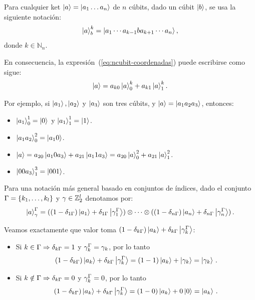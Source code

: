 \begin{notation}
  Para cualquier ket $\ket{a}=\ket{a_1\dots a_n}$ de $n$ cúbits, dado un cúbit $\ket{b}$, se usa la siguiente notación:
  \begin{equation}
    \label{eq:ncubit-only-one-state}
    \ket{a}^{k}_{b} = \ket{a_1\cdots a_{k-1}b a_{k+1}\cdots a_n},
  \end{equation}
  donde $k \in \mathbb{N}_n$.
\end{notation}

En consecuencia, la expresión~(\ref{eq:ncubit-coordenadas}) puede escribirse como sigue:
\begin{equation}
  \label{eq:canonical-state}
  \ket{a}= a_{k0}\ket{a}^{k}_{0}+a_{k1}\ket{a}^{k}_{1}.
\end{equation}

Por ejemplo, si $\ket{a_1},\ket{a_2}$ y $\ket{a_3}$ son tres cúbits, y $\ket{a} = \ket{a_1 a_2 a_3}$, entonces:
\begin{itemize}
  \item $\ket{a_1}^{1}_{0}=\ket{0}$ y $\ket{a_1}^{1}_{1}=\ket{1}$.
  \item $\ket{a_1 a_2}^{2}_{0}=\ket{a_1 0}$.
  \item $\ket{a}=a_{20}\ket{a_1 0 a_3}+a_{21}\ket{a_1 1 a_3}=a_{20}\ket{a}^{2}_{0}+a_{21}\ket{a}^{2}_{1}$.
  \item $\ket{00a_3}^{3}_{1}=\ket{001}$.
\end{itemize}

\begin{notation}
  Para una notación más general basado en conjuntos de índices, dado el conjunto $\Gamma=\{k_1,\dots,k_l\}$ y $\gamma\in\mathbb{Z}_2^l$ denotamos por:
  \[
    \ket{a}^{\Gamma}_{\gamma}=((1-\delta_{1\Gamma})\ket{a_1}+\delta_{1\Gamma}\ket{{\gamma}^{\Gamma}_1})\otimes\dots\otimes ((1-\delta_{n\Gamma})\ket{a_n}+\delta_{n\Gamma}\ket{{\gamma}^{\Gamma}_n})\,.
  \]
\end{notation}

Veamos exactamente que valor toma $(1-\delta_{k\Gamma})\ket{a_k}+\delta_{k\Gamma}\ket{{\gamma}^{\Gamma}_k}$:
\begin{itemize}
  \item Si $k\in\Gamma\Rightarrow\delta_{k\Gamma}=1$ y ${\gamma}^{\Gamma}_k=\gamma_k$, por lo tanto
        \begin{equation*}
          (1-\delta_{k\Gamma})\ket{a_k}+\delta_{k\Gamma}\ket{{\gamma}^{\Gamma}_k}=(1-1)\ket{a_k}+\ket{\gamma_k}=\ket{\gamma_k}\,.
        \end{equation*}
  \item Si $k\notin\Gamma\Rightarrow\delta_{k\Gamma}=0$ y ${\gamma}^{\Gamma}_k=0$, por lo tanto
        \begin{equation*}
          (1-\delta_{k\Gamma})\ket{a_k}+\delta_{k\Gamma}\ket{{\gamma}^{\Gamma}_k}=(1-0)\ket{a_k}+0\ket{0}=\ket{a_k}\,.
        \end{equation*}
\end{itemize}

